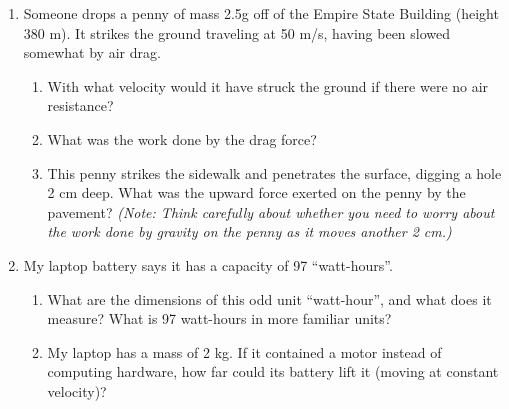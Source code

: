 \documentclass[12pt]{article}
\begin{document}
\Large
\centerline{}
\normalsize
\begin{enumerate}

	\item{Someone drops a penny of mass 2.5g off of the Empire State Building (height 380 m). It strikes the ground traveling at 50 m/s, having been slowed somewhat by air drag.}
\begin{enumerate}
	\item{With what velocity would it have struck the ground if there were no air resistance?}
	
	\vspace{1.5in}
	
	\item{What was the work done by the drag force?}
	
	\vspace{1.5in}
	
	\item{This penny strikes the sidewalk and penetrates the surface, digging a hole 2 cm deep. What was the upward force exerted on the penny by the pavement? {\it (Note: Think carefully about whether you need to worry about the work done by gravity on the penny as it moves another 2 cm.)}}
	
	\vspace{2in}
	
\end{enumerate}
\newpage

\item{My laptop battery says it has a capacity of 97 ``watt-hours''.}
\begin{enumerate}
	\item{What are the dimensions of this odd unit ``watt-hour'', and what does it measure? What is 97 watt-hours in more familiar units?}
	
	\vspace{2.5in}
	
	\item{My laptop has a mass of 2 kg. If it contained a motor instead of computing hardware, how far could its battery lift it (moving at constant velocity)?}
	
	\vspace{2.5in}
\end{enumerate}
\newpage
%
%	
%	
%	


\end{enumerate}
\end{document}

